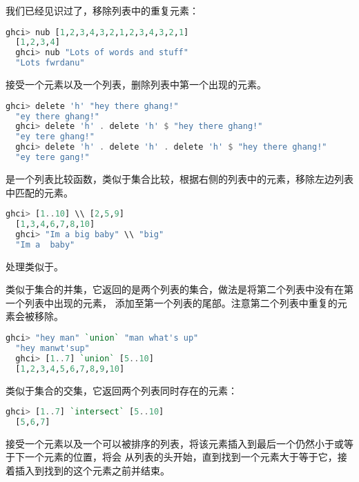 \documentclass[./main.tex]{subfiles}
\begin{document}
我们已经见识过了，移除列表中的重复元素：

\begin{lstlisting}[language=Haskell]
  ghci> nub [1,2,3,4,3,2,1,2,3,4,3,2,1]
  [1,2,3,4]
  ghci> nub "Lots of words and stuff"
  "Lots fwrdanu"
\end{lstlisting}

接受一个元素以及一个列表，删除列表中第一个出现的元素。

\begin{lstlisting}[language=Haskell]
  ghci> delete 'h' "hey there ghang!"
  "ey there ghang!"
  ghci> delete 'h' . delete 'h' $ "hey there ghang!"
  "ey tere ghang!"
  ghci> delete 'h' . delete 'h' . delete 'h' $ "hey there ghang!"
  "ey tere gang!"
\end{lstlisting}

\acodered{\\\\}是一个列表比较函数，类似于集合比较，根据右侧的列表中的元素，移除左边列表中匹配的元素。

\begin{lstlisting}[language=Haskell]
  ghci> [1..10] \\ [2,5,9]
  [1,3,4,6,7,8,10]
  ghci> "Im a big baby" \\ "big"
  "Im a  baby"
\end{lstlisting}

处理\acode{[1..10] \\\\ [2,5,9]}类似于。

类似于集合的并集，它返回的是两个列表的集合，做法是将第二个列表中没有在第一个列表中出现的元素，
添加至第一个列表的尾部。注意第二个列表中重复的元素会被移除。

\begin{lstlisting}[language=Haskell]
  ghci> "hey man" `union` "man what's up"
  "hey manwt'sup"
  ghci> [1..7] `union` [5..10]
  [1,2,3,4,5,6,7,8,9,10]
\end{lstlisting}

类似于集合的交集，它返回两个列表同时存在的元素：

\begin{lstlisting}[language=Haskell]
  ghci> [1..7] `intersect` [5..10]
  [5,6,7]
\end{lstlisting}

接受一个元素以及一个可以被排序的列表，将该元素插入到最后一个仍然小于或等于下一个元素的位置，将会
从列表的头开始，直到找到一个元素大于等于它，接着插入到找到的这个元素之前并结束。
\end{document}
